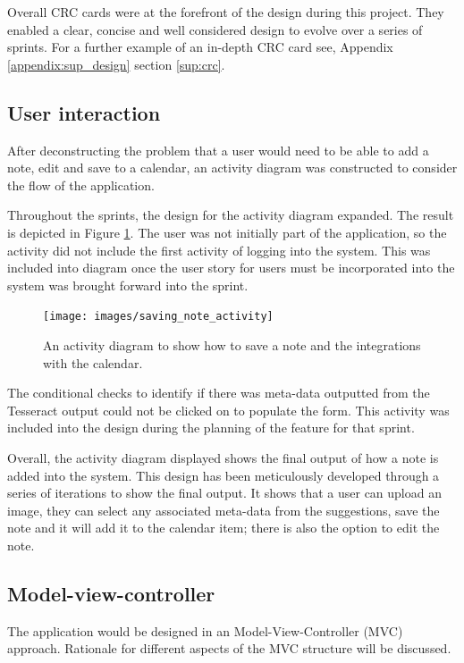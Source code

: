 Overall CRC cards were at the forefront of the design during this project. They enabled a clear, concise and well considered design to evolve over a series of sprints. For a further example of an in-depth CRC card see, Appendix \ref{appendix:sup_design} section \ref{sup:crc}.

\subsection{User interaction} \label{design:user_interaction}
After deconstructing the problem that a user would need to be able to add a note, edit and save to a calendar, an activity diagram was constructed to consider the flow of the application.

Throughout the sprints, the design for the activity diagram expanded. The result is depicted in Figure \ref{fig:activity_show_note}. The user was not initially part of the application, so the activity did not include the first activity of logging into the system. This was included into diagram once the user story for users must be incorporated into the system was brought forward into the sprint.

\begin{figure}[H]
  \centering
  \texttt{[image: images/saving\_note\_activity]}
  \caption{An activity diagram to show how to save a note and the integrations with the calendar.}
  \label{fig:activity_show_note}
\end{figure}

The conditional checks to identify if there was meta-data outputted from the Tesseract output could not be clicked on to populate the form. This activity was included into the design during the planning of the feature for that sprint.

Overall, the activity diagram displayed shows the final output of how a note is added into the system. This design has been meticulously developed through a series of iterations to show the final output. It shows that a user can upload an image, they can select any associated meta-data from the suggestions, save the note and it will add it to the calendar item; there is also the option to edit the note.

\subsection{Model-view-controller}
The application would be designed in an Model-View-Controller (MVC) approach. Rationale for different aspects of the MVC structure will be discussed.

